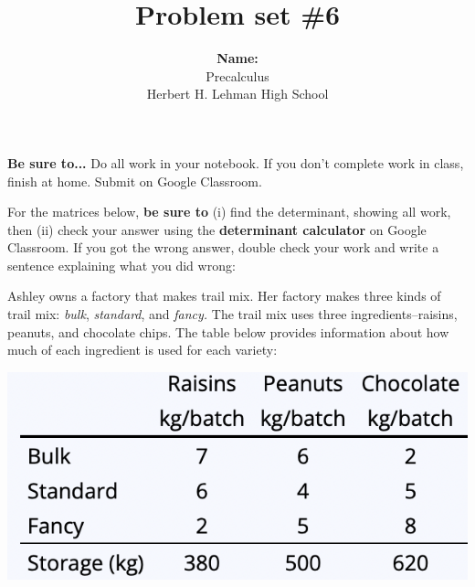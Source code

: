 \documentclass{exam}
\title{Problem set \#6}
\author{ \textbf{Name: }  \enspace\hrulefill \\ Precalculus \\ Herbert H. Lehman High School }
\begin{document}
\maketitle
\thispagestyle{empty}

\noindent\textbf{Be sure to...} Do all work in your notebook.  If you don't complete work in class, finish at home. Submit on Google Classroom.
\begin{questions}
\question 
For the matrices below, \textbf{be sure to} (i) find the determinant, showing all work, then (ii) check your answer using the \textbf{determinant calculator} on Google Classroom.  If you got the wrong answer, double check your work and write a sentence explaining what you did wrong:

\question 
Ashley owns a factory that makes trail mix.  Her factory makes three kinds of trail mix: \textit{bulk}, \textit{standard}, and \textit{fancy.} The trail mix uses three ingredients--raisins, peanuts, and chocolate chips. The table below provides information about how much of each ingredient is used for each variety:

\includegraphics[scale=0.5]{table.png}


\end{questions}
\end{document}
